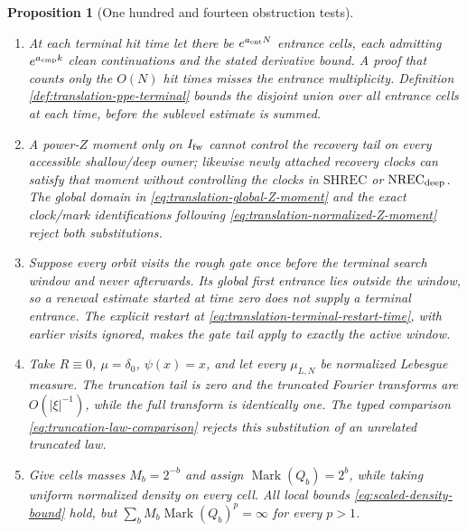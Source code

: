 \documentclass[11pt]{article}
\newtheorem{proposition}[theorem]{Proposition}
\begin{document}
\begin{proposition}[One hundred and fourteen obstruction tests]
\begin{enumerate}[label=\textup{(T\arabic*)}]
      frequency while restriction to successive misses concentrates on
      shorter and shorter curves and leaves the regular cone.  Ordinary
      mixing then does not justify multiplying the same block hazard.  The
      miss-conditioned stability in \textup{(G1)}, or the stopped renewal
      tail in \textup{(G2)}, of $\mathrm{TR\_PPE}_{\rm TERM}$ rejects this
      survivor-selection model.
\item At each terminal hit time let there be $e^{a_{\rm ent}N}$ entrance
      cells, each admitting $e^{a_{\rm cmp}k}$ clean continuations and the
      stated derivative bound.  A proof that counts only the $O(N)$ hit
      times misses the entrance multiplicity.  Definition
      \ref{def:translation-ppe-terminal} bounds the disjoint union over all
      entrance cells at each time, before the sublevel estimate is summed.
\item A power-$Z$ moment only on $I_{\rm fw}$ cannot control the recovery
      tail on every accessible shallow/deep owner; likewise newly attached
      recovery clocks can satisfy that moment without controlling the clocks
      in $\mathrm{SHREC}$ or $\mathrm{NREC}_{\rm deep}$.  The global domain
      in \eqref{eq:translation-global-Z-moment} and the exact clock/mark
      identifications following
      \eqref{eq:translation-normalized-Z-moment} reject both substitutions.
\item Suppose every orbit visits the rough gate once before the terminal
      search window and never afterwards.  Its global first entrance lies
      outside the window, so a renewal estimate started at time zero does not
      supply a terminal entrance.  The explicit restart at
      \eqref{eq:translation-terminal-restart-time}, with earlier visits
      ignored, makes the gate tail apply to exactly the active window.
\item Take $R\equiv0$, $\mu=\delta_0$, $\psi(x)=x$, and let every
      $\mu_{L,N}$ be normalized Lebesgue measure.  The truncation tail is zero
      and the truncated Fourier transforms are $O(|\xi|^{-1})$, while the full
      transform is identically one.  The typed comparison
      \eqref{eq:truncation-law-comparison} rejects this substitution of an
      unrelated truncated law.
\item Give cells masses $M_b=2^{-b}$ and assign
      $\operatorname{Mark}(Q_b)=2^b$, while taking uniform normalized density
      on every cell.  All local bounds \eqref{eq:scaled-density-bound} hold,
      but $\sum_bM_b\operatorname{Mark}(Q_b)^p=\infty$ for every $p>1$.

\end{enumerate}
\end{proposition}
\end{document}
